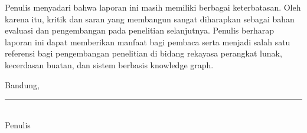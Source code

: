 Penulis menyadari bahwa laporan ini masih memiliki berbagai keterbatasan. Oleh karena itu, kritik dan saran yang membangun sangat diharapkan sebagai bahan evaluasi dan pengembangan pada penelitian selanjutnya. Penulis berharap laporan ini dapat memberikan manfaat bagi pembaca serta menjadi salah satu referensi bagi pengembangan penelitian di bidang rekayasa perangkat lunak, kecerdasan buatan, dan sistem berbasis knowledge graph.

\vspace{1.5cm}

\begin{flushright}
Bandung, \rule{4cm}{0.4pt}\\[1cm]
Penulis
\end{flushright}
